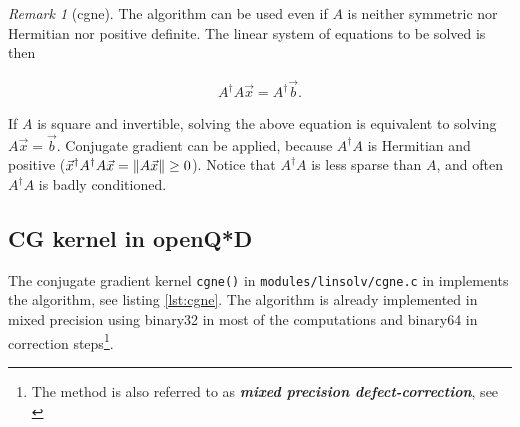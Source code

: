 \documentclass{article}
\theoremstyle{plain} %
\theoremstyle{convention} %
\theoremstyle{remark} %
\newtheorem*{remark}{Remark} %
\def\code#1{\texttt{#1}}
\def\df#1{\textbf{\textit{#1}}}
\numberwithin{equation}{section}
\begin{document}
\begin{remark}[\acrfull{cgne}]
    The algorithm can be used even if $A$ is neither symmetric nor Hermitian nor positive definite. The linear system of equations to be solved is then

    \begin{align*}
        A^{\dagger} A \vec{x} = A^{\dagger} \vec{b}.
    \end{align*}

    If $A$ is square and invertible, solving the above equation is equivalent to solving $A \vec{x} = \vec{b}$. Conjugate gradient can be applied, because $A^{\dagger} A$ is Hermitian and positive ($\vec{x}^{\dagger} A^{\dagger} A \vec{x} = \norm{A \vec{x}} \ge 0$). Notice that $A^{\dagger} A$ is less sparse than $A$, and often $A^{\dagger} A$ is badly conditioned.

\end{remark}

\subsection{CG kernel in openQ*D}

\label{sec:fp_in_openqxd}

The conjugate gradient kernel \code{cgne()} in \code{modules/linsolv/cgne.c} in \cite{openqxd} implements the algorithm, see listing \ref{lst:cgne}. The algorithm is already implemented in mixed precision using \gls{binary32} in most of the computations and \gls{binary64} in correction steps\footnote{The method is also referred to as \df{mixed precision defect-correction}, see \cite{goddeke2005}}.

\end{document}
